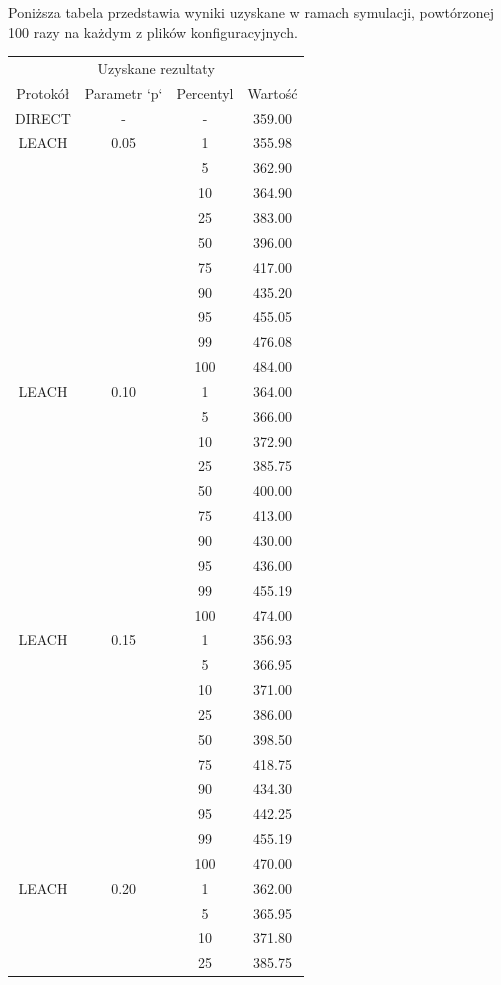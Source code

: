 \documentclass[a4paper,12pt,twoside,openany]{report}
\begin{document}
Poniższa tabela przedstawia wyniki uzyskane w ramach symulacji, powtórzonej 100 razy na każdym z plików konfiguracyjnych. 

\begin{longtable}{*{4}{c}}
\toprule
\multicolumn{4}{c}{Uzyskane rezultaty} \\
Protokół	& Parametr `p`	& Percentyl	& Wartość \\
\midrule
\endhead
DIRECT	& - 	& -	& 359.00 \\*
\midrule
LEACH	& 0.05	& 1	& 355.98 \\*
	&	& 5	& 362.90 \\*
	&	& 10	& 364.90 \\*
	&	& 25	& 383.00 \\*
	&	& 50	& 396.00 \\*
	&	& 75	& 417.00 \\*
	&	& 90	& 435.20 \\*
	&	& 95	& 455.05 \\*
	&	& 99	& 476.08 \\*
	&	& 100	& 484.00 \\*
\midrule
LEACH	& 0.10	& 1	& 364.00 \\*
	&	& 5	& 366.00 \\*
	&	& 10	& 372.90 \\*
	&	& 25	& 385.75 \\*
	&	& 50	& 400.00 \\*
	&	& 75	& 413.00 \\*
	&	& 90	& 430.00 \\*
	&	& 95	& 436.00 \\*
	&	& 99	& 455.19 \\*
	&	& 100	& 474.00 \\*
\midrule
LEACH	& 0.15	& 1	& 356.93 \\*
	&	& 5	& 366.95 \\*
	&	& 10	& 371.00 \\*
	&	& 25	& 386.00 \\*
	&	& 50	& 398.50 \\*
	&	& 75	& 418.75 \\*
	&	& 90	& 434.30 \\*
	&	& 95	& 442.25 \\*
	&	& 99	& 455.19 \\*
	&	& 100	& 470.00 \\*
\midrule
LEACH	& 0.20	& 1	& 362.00 \\*
	&	& 5	& 365.95 \\*
	&	& 10	& 371.80 \\*
	&	& 25	& 385.75 \\*

\end{longtable}
\end{document}
